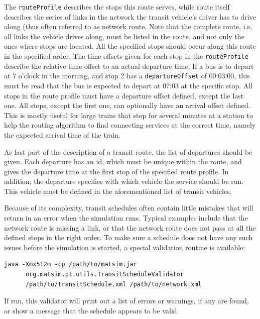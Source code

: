 The \lstinline|routeProfile| describes the stops this route serves, while route itself describes the series of links in the network the transit vehicle's driver has to drive along (thus often referred to as network route. Note that the complete route, i.e. all links the vehicle drives along, must be listed in the route, and not only the ones where stops are located. All the specified stops should occur along this route in the specified order. The time offsets given for each stop in the \lstinline|routeProfile| describe the relative time offset to an actual departure time. If a bus is to depart at 7 o'clock in the morning, and stop 2 has a \lstinline|departureOffset| of 00:03:00, this must be read that the bus is expected to depart at 07:03 at the specific stop. All stops in the route profile must have a departure offset defined, except the last one. All stops, except the first one, can optionally have an arrival offset defined. This is mostly useful for large trains that stop for several minutes at a station to help the routing algorithm to find connecting services at the correct time, namely the expected arrival time of the train.

As last part of the description of a transit route, the list of departures should be given. Each departure has an id, which must be unique within the route, and gives the departure time at the first stop of the specified route profile. In addition, the departure specifies with which vehicle the service should be run. This vehicle must be defined in the aforementioned list of transit vehicles. 

Because of its complexity, transit schedules often contain little mistakes that will return in an error when the simulation runs. Typical examples include that the network route is missing a link, or that the network route does not pass at all the defined stops in the right order. To make sure a schedule does not have any such issues before the simulation is started, a special validation routine is available:

\begin{lstlisting}
java -Xmx512m -cp /path/to/matsim.jar  
      org.matsim.pt.utils.TransitScheduleValidator  
      /path/to/transitSchedule.xml /path/to/network.xml
\end{lstlisting}

If run, this validator will print out a list of errors or warnings, if any are found, or show a message that the schedule appears to be valid. 

